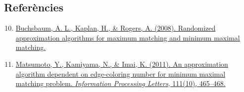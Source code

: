 \subsection*{Referències}
\begin{enumerate}
\setcounter{enumi}{9}
\item \href{https://link.springer.com/chapter/10.1007/978-3-540-93980-1_21}{Buchsbaum, A. L., Kaplan, H., \& Rogers, A. (2008). Randomized approximation algorithms for maximum matching and minimum maximal matching.}
\item \href{https://www.sciencedirect.com/science/article/abs/pii/S0020019011000408?via%3Dihub}{Matsumoto, Y., Kamiyama, N., \& Imai, K. (2011). An approximation algorithm dependent on edge-coloring number for minimum maximal matching problem. \textit{Information Processing Letters}, 111(10), 465--468.}
\end{enumerate}

